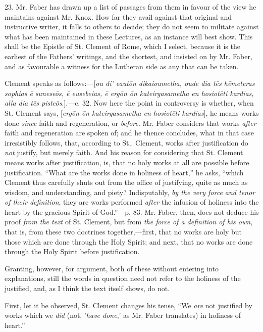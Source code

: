 23. Mr. Faber has drawn up a list of passages from them in favour
of the view he maintains against Mr. Knox. How far they avail against
that original and instructive writer, it falls to others to decide;
they do not seem to militate against what has been maintained in these
Lectures, as an instance will best show. This shall be the Epistle of
St. Clement of Rome, which I select, because it is the earliest of the
Fathers' writings, and the shortest, and insisted on by Mr. Faber, and
as favourable a witness for the Lutheran side as any that can be
taken.

Clement speaks as follows:—[\emph{ou di' eaut\={o}n
dikaioumetha, oude dia t\={e}s h\={e}meteras sophias \={e}
sunese\={o}s, \={e} eusebeias, \={e} erg\={o}n \={o}n
kateirgasametha en hosiot\={e}ti kardias, alla dia t\={e}s piste\={o}s}.].—c. 32.
Now here the point in controversy is whether, when St. Clement says, [\emph{erg\={o}n
\={o}n kateirgasametha en hosiot\={e}ti kardias}], he means works done \emph{since} faith and
regeneration, or \emph{before}. Mr. Faber considers that works \emph{after}
faith and regeneration are spoken of; and he thence concludes, what in
that case irresistibly follows, that, according to St,. Clement, works
after justification do \emph{not} justify, but merely faith. And his
reason for considering that St. Clement means works after justification, is, that no holy works at all are possible before
justification. ``What are the works done in holiness of
heart,'' he asks, ``which Clement thus carefully shuts out
from the office of justifying, quite as much as wisdom, and
understanding, and piety? Indisputably, \emph{by the very force and tenor
of their definition}, they are works performed \emph{after} the infusion
of holiness into the heart by the gracious Spirit of God.''—p.
83. Mr. Faber, then, does not deduce his proof \emph{from the text} of
St. Clement, but from \emph{the force of a definition of his own},
that is, from these two doctrines together,—first, that no works are
holy but those which are done through the Holy Spirit; and next, that
no works are done through the Holy Spirit before justification.

Granting, however, for argument, both of these without entering
into explanations, still the words in question need not refer to the
holiness of the justified, and, as I think the text itself shows, do
not.

First, let it be observed, St. Clement changes his tense, ``We \emph{are}
not justified by works which we \emph{did} (not, '\emph{have done},'
as Mr. Faber translates) in holiness of heart.''

